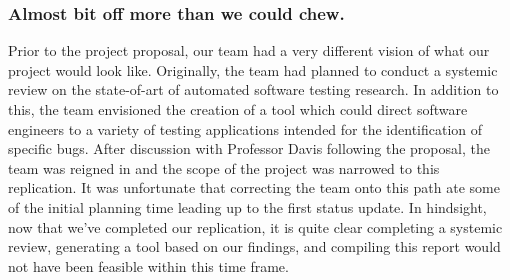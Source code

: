 







\subsubsection{\textbf{Almost bit off more than we could chew.}} Prior to the project proposal, our team had a very different vision of what our project would look like. Originally, the team had planned to conduct a systemic review on the state-of-art of automated software testing research. In addition to this, the team envisioned the creation of a tool which could direct software engineers to a variety of testing applications intended for the identification of specific bugs. After discussion with Professor Davis following the proposal, the team was reigned in and the scope of the project was narrowed to this replication. It was unfortunate that correcting the team onto this path ate some of the initial planning time leading up to the first status update. In hindsight, now that we've completed our replication, it is quite clear completing a systemic review, generating a tool based on our findings, and compiling this report would not have been feasible within this time frame.

